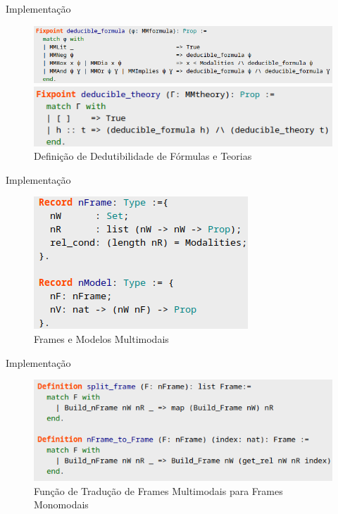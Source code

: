 \documentclass[xcolor=table]{beamer}
\begin{document}
    \begin{frame}{Implementação}
        \begin{adjustwidth}{-.8cm}{}
            \begin{figure}[htbp]
                \centering
                \includegraphics[scale=.5]{FormulaDedutivel.png}
                \begin{flushleft}
                    \includegraphics[scale=.5]{TeoriaDedutivel.png}
                \end{flushleft}
                \caption{Definição de Dedutibilidade de Fórmulas e Teorias}
            \end{figure}
        \end{adjustwidth}
    \end{frame}

    \begin{frame}{Implementação}
        \begin{figure}[htbp]
            \centering
            \includegraphics[scale=.6]{FramesModelosMM.png}
            \caption{Frames e Modelos Multimodais}
        \end{figure}
    \end{frame}

    \begin{frame}{Implementação}
        \begin{figure}[htbp]
            \centering
            \includegraphics[scale=.6]{FrameMM->Frame.png}
            \caption{Função de Tradução de Frames Multimodais para Frames Monomodais}
        \end{figure}
    \end{frame}
\end{document}
